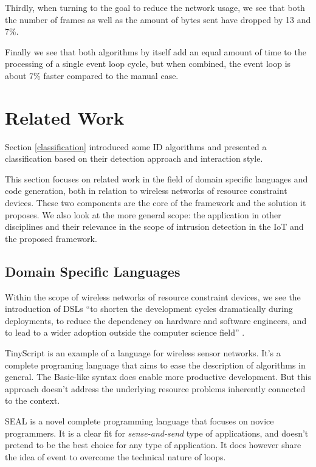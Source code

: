 \documentclass[conference]{IEEEtran}
\begin{document}
Thirdly, when turning to the goal to reduce the network usage, we see that both
the number of frames as well as the amount of bytes sent have dropped by 13 and
7\%.

Finally we see that both algorithms by itself add an equal amount of time to
the processing of a single event loop cycle, but when combined, the event loop
is about 7\% faster compared to the manual case.

\section{Related Work}
\label{related}

Section \ref{classification} introduced some ID
algorithms \cite{ganeriwal2008reputation,mishra2004intrusion,krontiris2009cooperative}
and presented a classification \cite{mishra2004intrusion,ioannis2007towards,alrajeh2013intrusion}
based on their detection approach and interaction style.

This section focuses on related work in the field of domain specific languages
and code generation, both in relation to wireless networks of resource
constraint devices. These two components are the core of the \NAME framework
and the solution it proposes. We also look at the more general scope: the
application in other disciplines and their relevance in the scope of intrusion
detection in the IoT and the proposed \NAME framework.

\subsection{Domain Specific Languages}

Within the scope of wireless networks of resource constraint devices, we see
the introduction of DSLs \enquote{to shorten the development cycles
dramatically during deployments, to reduce the dependency on hardware and
software engineers, and to lead to a wider adoption outside the computer
science field} \cite{sadilek2008domain,naumowicz2009prototyping}.

TinyScript \cite{levis2004tinyscript} is an example of a language for wireless
sensor networks. It's a complete programing language that aims to ease the
description of algorithms in general. The Basic-like syntax does enable more
productive development. But this approach doesn't address the underlying
resource problems inherently connected to the context.

SEAL \cite{elsts2013seal} is a novel complete programming language that focuses
on novice programmers. It is a clear fit for \emph{sense-and-send} type of
applications, and doesn't pretend to be the best choice for any type of
application. It does however share the idea of event to overcome the technical
nature of loops.
\end{document}
